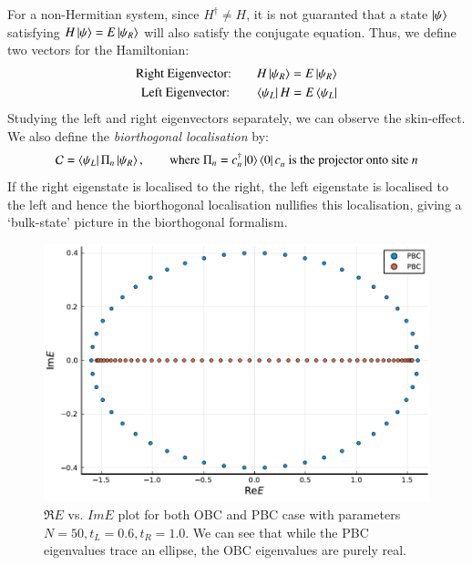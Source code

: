 For a non-Hermitian system, since $H^\dagger\neq H$, it is not guaranted that a state $\ket{\psi}$ satisfying $H\ket{\psi} = E\ket{\psi_R}$ will also satisfy the conjugate equation. Thus, we define two vectors for the Hamiltonian:
\begin{align*}
    \text{Right Eigenvector:\qquad} H\ket{\psi_R} = E\ket{\psi_R}\\
    \text{Left Eigenvector:\qquad} \bra{\psi_L} H = E \bra{\psi_L}
\end{align*}
Studying the left and right eigenvectors separately, we can observe the skin-effect. We also define the \textit{biorthogonal localisation} by: 
$$\mathcal C = \bra{\psi_L}\Pi_n \ket{\psi_R}, \qquad \text{where } \Pi_n = c\y_n \ket{0}\bra{0}c\py_n \text{ is the projector onto site $n$}$$
If the right eigenstate is localised to the right, the left eigenstate is localised to the left and hence the biorthogonal localisation nullifies this localisation, giving a `bulk-state' picture in the biorthogonal formalism. 
\begin{figure}[H]
    \centering 
    \includegraphics[scale=0.3]{FIGS_MANUS_NHSE/E_pbc_obc.pdf}
    \caption{$\Re E$ vs. $Im E$ plot for both OBC and PBC case with parameters $N=50,t_L=0.6, t_R=1.0$. We can see that while the PBC eigenvalues trace an ellipse, the OBC eigenvalues are purely real.  }
\end{figure}
